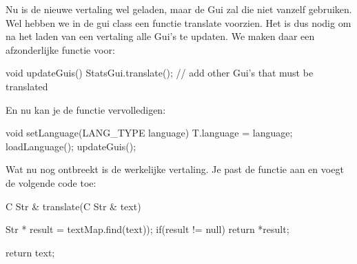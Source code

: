 Nu is de nieuwe vertaling wel geladen, maar de Gui zal die niet vanzelf gebruiken. Wel hebben we in de gui class een functie translate voorzien. Het is dus nodig om na het laden van een vertaling alle Gui's te updaten. We maken daar een afzonderlijke functie voor:

\begin{code}
void updateGuis()
{
  StatsGui.translate();
  // add other Gui's that must be translated
}
\end{code}

En nu kan je de functie  vervolledigen:

\begin{code}
void setLanguage(LANG_TYPE language)
{
  T.language = language;
  loadLanguage();
  updateGuis();
}
\end{code}

Wat nu nog ontbreekt is de werkelijke vertaling. Je past de functie  aan en voegt de volgende code toe:

\begin{code}
C Str & translate(C Str & text)
{
  Str * result = textMap.find(text));
  if(result != null) return *result;
  
  return text;
}
\end{code}





